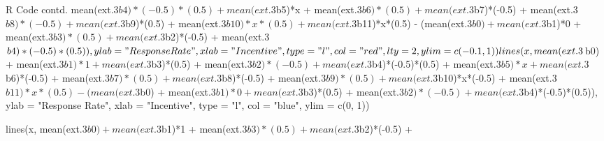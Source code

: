 \documentclass{article}
\begin{document}
        \begin{sexylisting}{R Code contd.}
        mean(ext.3$b4)*(-0.5)*(0.5) +
        mean(ext.3$b5)*x +
        mean(ext.3$b6)*(0.5) +
        mean(ext.3$b7)*(-0.5) +
        mean(ext.3$b8)*(-0.5) +
        mean(ext.3$b9)*(0.5) +
        mean(ext.3$b10)*x*(0.5) +
        mean(ext.3$b11)*x*(0.5) -
        (mean(ext.3$b0) + 
           mean(ext.3$b1)*0 + 
           mean(ext.3$b3)*(0.5) +
           mean(ext.3$b2)*(-0.5) +
           mean(ext.3$b4)*(-0.5)*(0.5)),
      ylab = "Response Rate", xlab = "Incentive",
      type = "l", col = "red", lty = 2, 
      ylim = c(-0.1, 1))

lines(x, mean(ext.3$b0) + 
        mean(ext.3$b1)*1 + 
        mean(ext.3$b3)*(0.5) +
        mean(ext.3$b2)*(-0.5) +
        mean(ext.3$b4)*(-0.5)*(0.5) +
        mean(ext.3$b5)*x +
        mean(ext.3$b6)*(-0.5) +
        mean(ext.3$b7)*(0.5) +
        mean(ext.3$b8)*(-0.5) +
        mean(ext.3$b9)*(0.5) +
        mean(ext.3$b10)*x*(-0.5) +
        mean(ext.3$b11)*x*(0.5) -
        (mean(ext.3$b0) + 
           mean(ext.3$b1)*0 + 
           mean(ext.3$b3)*(0.5) +
           mean(ext.3$b2)*(-0.5) +
           mean(ext.3$b4)*(-0.5)*(0.5)),
      ylab = "Response Rate", xlab = "Incentive",
      type = "l", col = "blue", 
      ylim = c(0, 1))

lines(x, mean(ext.3$b0) + 
        mean(ext.3$b1)*1 + 
        mean(ext.3$b3)*(0.5) +
        mean(ext.3$b2)*(-0.5) +
        \end{sexylisting}
\end{document}
